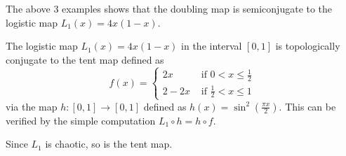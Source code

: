 \begin{example}\label{ex_logistic_and_doubling}
	The above 3 examples shows that the doubling map is semiconjugate to the logistic map $L_1(x) = 4x(1-x)$.
\end{example}

\begin{example}\label{ex:logistic and tent}
	The logistic map $L_1(x) = 4x(1-x)$ in the interval $[0,1]$ is topologically conjugate to the tent map defined as 
	\begin{equation}
		f(x) = 
		\begin{cases}
			2x   &\text{ if } 0<x \leq \frac{1}{2} \\ 
			2-2x &\text{ if } \frac{1}{2} < x \leq 1
		\end{cases}
	\end{equation}
	via the map $h: [0,1] \rightarrow [0,1]$ defined as $h(x) = \sin^2(\frac{\pi x}{2})$.
	This can be verified by the simple computation $L_1 \circ h = h \circ f$.

	Since $L_1$ is chaotic, so is the tent map.
\end{example}